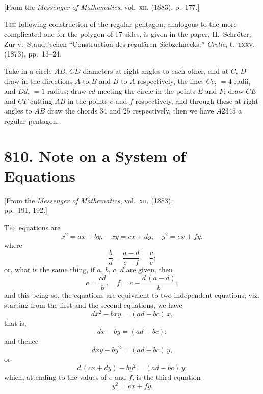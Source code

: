 \documentclass[11pt,a4paper]{book}
\begin{document}
\begin{center}
\small[From the \textit{Messenger of Mathematics}, vol.~\textsc{xii}. (1883), p.~177.]
\end{center}

\bigskip

\noindent
\textsc{The} following construction of the regular pentagon, analogous to the more complicated one for the polygon of 17 sides, is given in the paper, H.~Schr\"{o}ter, Zur v.~Staudt'schen ``Construction des regul\"{a}ren Siebzehnecks,'' \textit{Crelle}, t.~\textsc{lxxv.} (1873), pp.~13--24.

Take in a circle $AB$, $CD$ diameters at right angles to each other, and at $C$, $D$ draw in the directions $A$ to $B$ and $B$ to $A$ respectively, the lines $Cc$, $= 4$ radii, and $Dd$, $= 1$ radius; draw $cd$ meeting the circle in the points $E$ and $F$; draw $CE$ and $CF$ cutting $AB$ in the points $e$ and $f$ respectively, and through these at right angles to $AB$ draw the chords $34$ and $25$ respectively, then we have $A2345$ a regular pentagon.


\newpage
\section*{810. Note on a System of Equations}

\begin{center}
\small[From the \textit{Messenger of Mathematics}, vol.~\textsc{xii}. (1883),\\
pp.~191, 192.]
\end{center}

\bigskip

\noindent
\textsc{The} equations are
\[
x^2 = ax + by,\quad xy = cx + dy,\quad y^2 = ex + fy,
\]
where
\[
\frac{b}{d} = \frac{a-d}{c-f} = \frac{c}{e};
\]
or, what is the same thing, if $a$, $b$, $c$, $d$ are given, then
\[
e = \frac{cd}{b},\quad f = c - \frac{d\,(a-d)}{b};
\]
and this being so, the equations are equivalent to two independent equations; viz. starting from the first and the second equations, we have
\[
dx^2 - bxy = (ad-bc)\,x,
\]
that is,
\[
dx - by = (ad-bc):
\]
and thence
\[
dxy - by^2 = (ad-bc)\,y,
\]
or
\[
d\,(cx+dy) - by^2 = (ad-bc)\,y;
\]
which, attending to the values of $e$ and $f$, is the third equation
\[
y^2 = ex + fy.
\]
\end{document}
